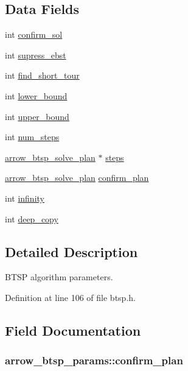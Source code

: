 \subsection*{Data Fields}
\begin{CompactItemize}
\item 
int \hyperlink{structarrow__btsp__params_2c579feb3ff41f4d73b5de97596fe465}{confirm\_\-sol}
\item 
int \hyperlink{structarrow__btsp__params_cd85b850ac7c8495a4689100e8c3182c}{supress\_\-ebst}
\item 
int \hyperlink{structarrow__btsp__params_f5fd677200b64930838c6905cbada990}{find\_\-short\_\-tour}
\item 
int \hyperlink{structarrow__btsp__params_da747e3797f9327834e4dbb1459d2786}{lower\_\-bound}
\item 
int \hyperlink{structarrow__btsp__params_b8749004215015a78139b8e4e1fb8905}{upper\_\-bound}
\item 
int \hyperlink{structarrow__btsp__params_2897d24f2fdd53c723609cf68880f55e}{num\_\-steps}
\item 
\hyperlink{structarrow__btsp__solve__plan}{arrow\_\-btsp\_\-solve\_\-plan} $\ast$ \hyperlink{structarrow__btsp__params_49aedb95b2fc4a725e3bb8485470484b}{steps}
\item 
\hyperlink{structarrow__btsp__solve__plan}{arrow\_\-btsp\_\-solve\_\-plan} \hyperlink{structarrow__btsp__params_f6a3bf7e56264d14b9dceb4ce779363c}{confirm\_\-plan}
\item 
int \hyperlink{structarrow__btsp__params_a035c57dbce866d9b880f2cb9b5a74ed}{infinity}
\item 
int \hyperlink{structarrow__btsp__params_9f41e1fdf1d45581136187929ca57615}{deep\_\-copy}
\end{CompactItemize}


\subsection{Detailed Description}
BTSP algorithm parameters. 

Definition at line 106 of file btsp.h.

\subsection{Field Documentation}
\hypertarget{structarrow__btsp__params_f6a3bf7e56264d14b9dceb4ce779363c}{
\subsubsection[{confirm\_\-plan}]{ {\bf arrow\_\-btsp\_\-params::confirm\_\-plan}}}
\label{structarrow__btsp__params_f6a3bf7e56264d14b9dceb4ce779363c}



